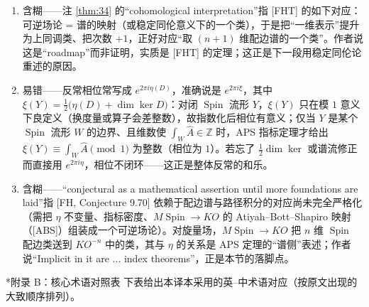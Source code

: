 \documentclass[11pt]{amsart}
\makeatletter
\def\section{\@startsection{section}{1}%
  \z@{4\linespacing\@plus\linespacing}{\linespacing}%
  {\bfseries\centering}}
\theoremstyle{definition}
\theoremstyle{remark}
\theoremstyle{plain}
\numberwithin{equation}{section}
\renewcommand{\:}{\colon}
\newcommand{\Ahat}{{\hat A}}
\DeclareMathOperator{\Spin}{Spin}
\newcommand{\ZZ}{{\mathbb Z}}
\makeatother
\begin{document}
\begin{enumerate}[leftmargin=2.2em,itemsep=2pt,topsep=2pt]
  \item 含糊——注 \ref{thm:34} 的“cohomological interpretation”指 [FHT] 的如下对应：可逆场论 = 谱的映射（或稳定同伦意义下的一个类），于是把“一维表示”提升为上同调类、把次数 $+1$，正好对应“取 $(n+1)$ 维配边谱的一个类”。作者说这是“roadmap”而非证明，实质是 [FHT] 的定理；这正是下一段用稳定同伦论重述的原因。
  \item 易错——反常相位常写成 $e^{2\pi i\eta(D)}$，准确说是 $e^{2\pi i\xi}$，其中 $\xi(Y)=\frac{1}{2}\bigl(\eta(D)+\dim\ker D\bigr)$：对闭 $\Spin$ 流形 $Y$，$\xi(Y)$ 只在模 $1$ 意义下良定义（换度量或算子会差整数），故指数化后相位有意义；仅当 $Y$ 是某个 $\Spin$ 流形 $W$ 的边界、且维数使 $\int_W\Ahat\in\ZZ$ 时，APS 指标定理才给出 $\xi(Y)\equiv\int_W\Ahat\pmod 1$ 为整数（相位为 $1$）。若忘了 $\frac{1}{2}\dim\ker$ 或谱流修正而直接用 $e^{2\pi i\eta}$，相位不闭环——这正是整体反常的和乐。
  \item 含糊——“conjectural as a mathematical assertion until more foundations are laid”指 [FH, Conjecture 9.70] 依赖于配边谱与路径积分的对应尚未完全严格化（需把 $\eta$ 不变量、指标密度、$M\!\Spin\to KO$ 的 Atiyah–Bott–Shapiro 映射（[ABS]）组装成一个可逆场论）。对旋量场，$M\!\Spin\to KO$ 把 $n$ 维 $\Spin$ 配边类送到 $KO^{-n}$ 中的类，其与 $\eta$ 的关系是 APS 定理的“谱侧”表述；作者说“Implicit in it are ... index theorems”，正是本节的落脚点。
\end{enumerate}



\clearpage
\section*{附录 B：核心术语对照表}
\noindent 下表给出本译本采用的英--中术语对应（按原文出现的大致顺序排列）。
\end{document}
